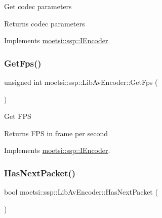 Get codec parameters \begin{DoxyReturn}{Returns}
codec parameters 
\end{DoxyReturn}


Implements \hyperlink{classmoetsi_1_1ssp_1_1IEncoder_ad5179efaa4c74207766dd64f46f4059a}{moetsi\+::ssp\+::\+I\+Encoder}.

\mbox{\label{classmoetsi_1_1ssp_1_1LibAvEncoder_ae21f81cb967359132183a29e04307933}} 
\subsubsection{\texorpdfstring{Get\+Fps()}{GetFps()}}
{\footnotesize\ttfamily unsigned int moetsi\+::ssp\+::\+Lib\+Av\+Encoder\+::\+Get\+Fps (\begin{DoxyParamCaption}{ }\end{DoxyParamCaption})\hspace{0.3cm}{\ttfamily [virtual]}}

Get F\+PS \begin{DoxyReturn}{Returns}
F\+PS in frame per second 
\end{DoxyReturn}


Implements \hyperlink{classmoetsi_1_1ssp_1_1IEncoder_ae6a865aa52230d81aed1cb5232402f6c}{moetsi\+::ssp\+::\+I\+Encoder}.

\mbox{\label{classmoetsi_1_1ssp_1_1LibAvEncoder_a306c0935fa37bd35ddfeb8290289e927}} 
\subsubsection{\texorpdfstring{Has\+Next\+Packet()}{HasNextPacket()}}
{\footnotesize\ttfamily bool moetsi\+::ssp\+::\+Lib\+Av\+Encoder\+::\+Has\+Next\+Packet (\begin{DoxyParamCaption}{ }\end{DoxyParamCaption})\hspace{0.3cm}{\ttfamily [virtual]}}

